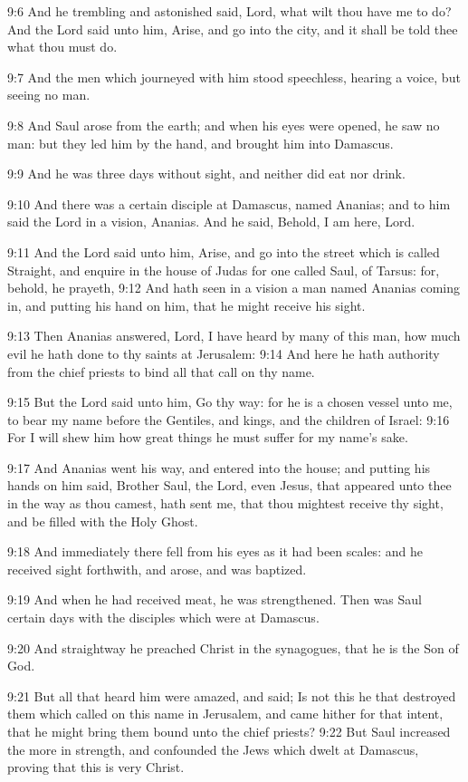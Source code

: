 9:6 And he trembling and astonished said, Lord, what wilt thou have me
to do? And the Lord said unto him, Arise, and go into the city, and it
shall be told thee what thou must do.

9:7 And the men which journeyed with him stood speechless, hearing a
voice, but seeing no man.

9:8 And Saul arose from the earth; and when his eyes were opened, he
saw no man: but they led him by the hand, and brought him into
Damascus.

9:9 And he was three days without sight, and neither did eat nor
drink.

9:10 And there was a certain disciple at Damascus, named Ananias; and
to him said the Lord in a vision, Ananias. And he said, Behold, I am
here, Lord.

9:11 And the Lord said unto him, Arise, and go into the street which
is called Straight, and enquire in the house of Judas for one called
Saul, of Tarsus: for, behold, he prayeth, 9:12 And hath seen in a
vision a man named Ananias coming in, and putting his hand on him,
that he might receive his sight.

9:13 Then Ananias answered, Lord, I have heard by many of this man,
how much evil he hath done to thy saints at Jerusalem: 9:14 And here
he hath authority from the chief priests to bind all that call on thy
name.

9:15 But the Lord said unto him, Go thy way: for he is a chosen vessel
unto me, to bear my name before the Gentiles, and kings, and the
children of Israel: 9:16 For I will shew him how great things he must
suffer for my name's sake.

9:17 And Ananias went his way, and entered into the house; and putting
his hands on him said, Brother Saul, the Lord, even Jesus, that
appeared unto thee in the way as thou camest, hath sent me, that thou
mightest receive thy sight, and be filled with the Holy Ghost.

9:18 And immediately there fell from his eyes as it had been scales:
and he received sight forthwith, and arose, and was baptized.

9:19 And when he had received meat, he was strengthened. Then was Saul
certain days with the disciples which were at Damascus.

9:20 And straightway he preached Christ in the synagogues, that he is
the Son of God.

9:21 But all that heard him were amazed, and said; Is not this he that
destroyed them which called on this name in Jerusalem, and came hither
for that intent, that he might bring them bound unto the chief
priests?  9:22 But Saul increased the more in strength, and confounded
the Jews which dwelt at Damascus, proving that this is very Christ.

